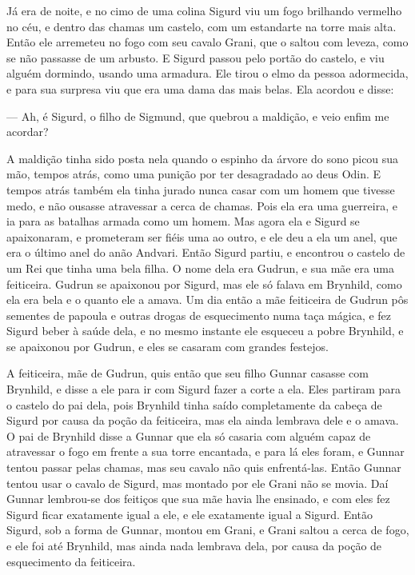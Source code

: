 Já era de noite, e no cimo de uma colina Sigurd viu um fogo brilhando
vermelho no céu, e dentro das chamas um castelo, com um estandarte na
torre mais alta. Então ele arremeteu no fogo com seu cavalo Grani,
que o saltou com leveza, como se não passasse de um arbusto. E Sigurd
passou pelo portão do castelo, e viu alguém dormindo, usando uma
armadura. Ele tirou o elmo da pessoa adormecida, e para sua surpresa
viu que era uma dama das mais belas. Ela acordou e disse:

— Ah, é Sigurd, o filho de Sigmund, que quebrou a maldição, e veio
enfim me acordar?

A maldição tinha sido posta nela quando o espinho da árvore do sono
picou sua mão, tempos atrás, como uma punição por ter desagradado ao
deus Odin. E tempos atrás também ela tinha jurado nunca casar com um
homem que tivesse medo, e não ousasse atravessar a cerca de chamas.
Pois ela era uma guerreira, e ia para as batalhas armada como um
homem. Mas agora ela e Sigurd se apaixonaram, e prometeram ser fiéis
uma ao outro, e ele deu a ela um anel, que era o último anel do anão
Andvari. Então Sigurd partiu, e encontrou o castelo de um Rei que
tinha uma bela filha. O nome dela era Gudrun, e sua mãe era uma
feiticeira. Gudrun se apaixonou por Sigurd, mas ele só falava em
Brynhild, como ela era bela e o quanto ele a amava. Um dia então a
mãe feiticeira de Gudrun pôs sementes de papoula e outras drogas de
esquecimento numa taça mágica, e fez Sigurd beber à saúde dela, e no
mesmo instante ele esqueceu a pobre Brynhild, e se apaixonou por
Gudrun, e eles se casaram com grandes festejos.

A feiticeira, mãe de Gudrun, quis então que seu filho Gunnar casasse
com Brynhild, e disse a ele para ir com Sigurd fazer a corte a ela.
Eles partiram para o castelo do pai dela, pois Brynhild tinha saído
completamente da cabeça de Sigurd por causa da poção da feiticeira,
mas ela ainda lembrava dele e o amava. O pai de Brynhild disse a
Gunnar que ela só casaria com alguém capaz de atravessar o fogo em
frente a sua torre encantada, e para lá eles foram, e Gunnar tentou
passar pelas chamas, mas seu cavalo não quis enfrentá-las. Então
Gunnar tentou usar o cavalo de Sigurd, mas montado por ele Grani não
se movia. Daí Gunnar lembrou-se dos feitiços que sua mãe havia lhe
ensinado, e com eles fez Sigurd ficar exatamente igual a ele, e ele
exatamente igual a Sigurd. Então Sigurd, sob a forma de Gunnar,
montou em Grani, e Grani saltou a cerca de fogo, e ele foi até
Brynhild, mas ainda nada lembrava dela, por causa da poção de
esquecimento da feiticeira.

